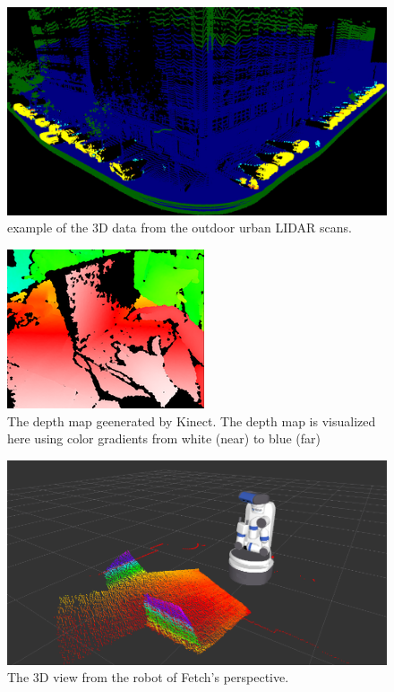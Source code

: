 \documentclass[a4paper,12pt]{article}
\begin{document}
 
 \begin{figure}[H]
  \begin{center}
      \includegraphics[scale=0.22]{cnn.jpg}
\end{center}
\caption{example of the 3D data from the outdoor urban LIDAR scans\cite{allancnn}.}
 \label{fig:lidar}
 \end{figure}


\begin{figure}[H]
  \begin{center}
      \includegraphics[scale=0.9]{Kinect2-deepmap.png}
\end{center}
\caption{The depth map geenerated by Kinect. The depth map is visualized here using color gradients from white (near) to blue (far)\cite{kinect}}
 \label{fig:kinect}
 \end{figure}
 
 
  
  \begin{figure}[H]
  \begin{center}
      \includegraphics[scale=0.4]{rviz.png}
\end{center}
\caption{The 3D view from the robot of Fetch's perspective.}
 \label{fig:fetch}
 \end{figure}
 
\end{document}
